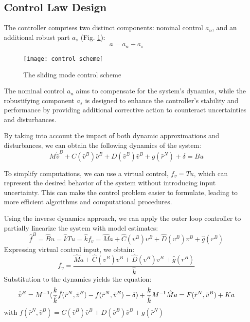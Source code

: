 \subsection{Control Law Design}

    The controller comprises two distinct components: nominal control $a_n$, 
    and an additional robust part $a_s$ (Fig. \ref{image:control_scheme}): 
    $$
        a = a_n + a_s
    $$
    \begin{figure}[H]
        \centering\texttt{[image: control\_scheme]}
        \caption{The sliding mode control scheme}
        \label{image:control_scheme}
    \end{figure}
    The nominal control $a_n$ aims to compensate for the system's dynamics, 
    while the robustifying component $a_s$ is designed to enhance the 
    controller's stability and performance by providing additional corrective 
    action to counteract uncertainties and disturbances.

    By taking into account the impact of both dynamic approximations 
    and disturbances, we can obtain the following dynamics of the 
    system:
    $$
    M \dot{\bar{v}}^B + C(\bar{v}^B) \bar{v}^B+D(\bar{v}^B) \bar{v}^B+g(\bar{r}^N)
     + \delta = Bu
    $$

    To simplify computations, we can use a virtual control, $f_v = Tu$, which can represent 
    the desired behavior of the system without introducing input uncertainty. This can make the control problem easier to 
    formulate, leading to more efficient algorithms and computational procedures. 

    Using the inverse dynamics approach, we can apply the outer loop 
    controller to partially linearize the system with model estimates:
    $$
    \hat{f}^B = \hat{B}u = \hat{k}Tu = \hat{k}f_v = \hat{M}a + \hat{C}(v^B)v^B + \hat{D}(v^B)v^B + \hat{g}(r^B)
    $$
    Expressing virtual control input, we obtain:
    $$
    f_v = \frac{\hat{M}a + \hat{C}(v^B)v^B + \hat{D}(v^B)v^B + \hat{g}(r^B)}{\hat{k}}
    $$
    Substitution to the dynamics yields the equation:
    $$
        \dot{\bar{v}}^B = M^{-1}(\frac{k}{\hat{k}}\hat{f}(\bar{r}^N, \bar{v}^B) - f(\bar{r}^N, \bar{v}^B)
         - \delta) + \frac{k}{\hat{k}}M^{-1}\hat{M}a \\
        = F(\bar{r}^N, \bar{v}^B) + Ka
    $$
    with 
    $f(\bar{r}^N, \bar{v}^B) = 
    C(\bar{v}^B) \bar{v}^B + D(\bar{v}^B) \bar{v}^B + g(\bar{r}^N)$

